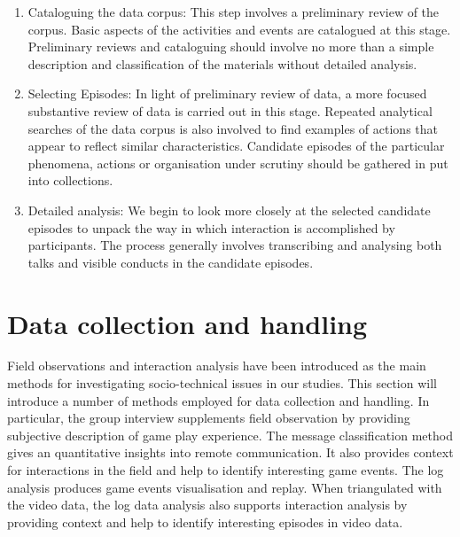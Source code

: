 \begin{enumerate}

\item Cataloguing the data corpus: This step involves a preliminary review of the corpus. Basic aspects of the activities and events are catalogued at this stage. Preliminary reviews and cataloguing should involve no more than a simple description and classification of the materials without detailed analysis. \\

\item Selecting Episodes: In light of preliminary review of data, a more focused substantive review of data is carried out in this stage. Repeated analytical searches of the data corpus is also involved to find examples of actions that appear to reflect similar characteristics. Candidate episodes of the particular phenomena, actions or organisation under scrutiny should be gathered in put into collections. \\

\item Detailed analysis:  We begin to look more closely at the selected candidate episodes to unpack the way in which interaction is accomplished by participants. The process generally involves transcribing and analysing both talks and visible conducts in the candidate episodes. \\ 

\end{enumerate}




\section{Data collection and handling}
Field observations and interaction analysis have been introduced as the main methods for investigating socio-technical issues in our studies. This section will introduce a number of methods employed for data collection and handling. In particular, the group interview supplements field observation by providing subjective description of game play experience. The message classification method gives an quantitative insights into remote communication. It also provides context for interactions in the field and help to identify interesting game events. The log analysis produces game events visualisation and replay. When triangulated with the video data, the log data analysis also supports interaction analysis by providing context and help to identify interesting episodes in video data.\\

